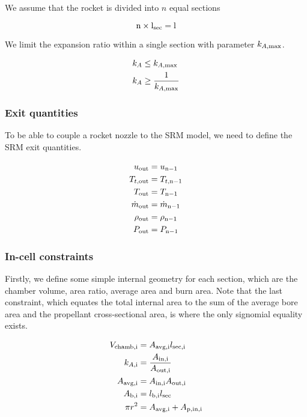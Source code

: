 We assume that the rocket is divided into $n$ equal sections

\begin{equation}
    \rm{n} \times l_{\rm{sec}} = l
\end{equation}

We limit the expansion ratio within a single section with parameter $k_{A, \rm{max}}$.

\begin{align}
    k_A &\leq k_{A,\rm{max}} \\
    k_A &\geq \frac{1}{k_{A,\rm{max}}}
\end{align}

\subsubsection{Exit quantities}

To be able to couple a rocket nozzle to the SRM model,
we need to define the SRM exit quantities.

\begin{align}
    u_{\rm{out}} &= u_{\rm{n}-1} \\
    T_{t,\rm{out}} &= T_{t,\rm{n}-1} \\
    T_{\rm{out}} &= T_{\rm{n}-1} \\
    \dot{m}_{\rm{out}} &= \dot{m}_{\rm{n}-1} \\
    \rho_{\rm{out}} &= \rho_{\rm{n}-1} \\
    P_{\rm{out}} &= P_{\rm{n}-1}
\end{align}

\subsubsection{In-cell constraints}

Firstly, we define some simple internal geometry for each section, which are the
chamber volume, area ratio, average area and burn area.
Note that the last constraint, which equates the total internal area to the
sum of the average bore area and the propellant cross-sectional area,
is where the only signomial equality exists.

\begin{align}
    V_{\rm{chamb}, \rm{i}} &= A_{\rm{avg}, \rm{i}} l_{\rm{sec}, \rm{i}} \\
    k_{A, \rm{i}} &= \frac{A_{\rm{in}, \rm{i}}}{A_{\rm{out}, \rm{i}}}  \\
    A_{\rm{avg, i}} &= A_{\rm{in}, \rm{i}} A_{\rm{out}, \rm{i}} \\
    A_{\rm{b, i}} &= l_{\rm{b,i}} l_{\rm{sec}} \\
    \pi r^2 &= A_{\rm{avg, i}} + A_{\rm{p, in, i}}
\end{align}

